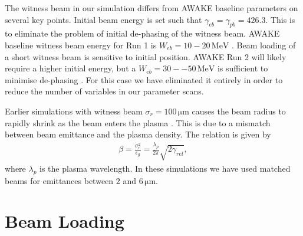 \documentclass[aps,prstab,reprint,amsmath,amssymb,groupedaddress]{revtex4-1}
\newcommand{\unit}[1]{\,\mathrm{#1}}
\begin{document}
The witness beam in our simulation differs from AWAKE baseline parameters on several key points. Initial beam energy is
set such that $\gamma_{eb} = \gamma_{pb} = 426.3$. This is to eliminate the problem of initial de-phasing of the witness
beam. AWAKE baseline witness beam energy for Run 1 is $W_{eb} = 10-20\unit{MeV}$ \cite{gschwendtner:2016}. Beam loading
of a short witness beam is sensitive to initial position. AWAKE Run 2 will likely require a higher initial energy, but a
$W_{eb} = 30--50\unit{MeV}$ is sufficient to minimise de-phasing \cite{berglyd_olsen:2015}. For this case we have
eliminated it entirely in order to reduce the number of variables in our parameter scans.

Earlier simulations with witness beam $\sigma_{r} = 100\unit{\mu m}$ causes the beam radius to rapidly shrink as the
beam enters the plasma \cite{berglyd_olsen:2016}. This is due to a mismatch between beam emittance and the plasma
density. The relation is given by
\begin{align}
    \beta = \frac{\sigma_r^2}{\epsilon_g} = \frac{\lambda_p}{2\pi}\sqrt{2\gamma_{rel}}, \label{EQ:Matched}
\end{align}
where $\lambda_{p}$ is the plasma wavelength. In these simulations we have used matched beams for emittances between
$2$ and $6\unit{\mu m}$.

\section[\label{S:BL}]{Beam Loading}
\end{document}
